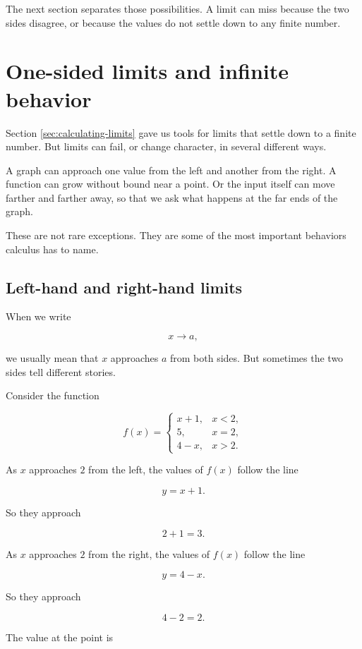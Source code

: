 The next section separates those possibilities.  A limit can miss because the two sides disagree, or because the values do not settle down to any finite number.
\section{One-sided limits and infinite behavior}
\label{sec:one-sided-infinite-limits}

Section \ref{sec:calculating-limits} gave us tools for limits that settle down to a finite number.  But limits can fail, or change character, in several different ways.

A graph can approach one value from the left and another from the right.  A function can grow without bound near a point.  Or the input itself can move farther and farther away, so that we ask what happens at the far ends of the graph.

These are not rare exceptions.  They are some of the most important behaviors calculus has to name.

\subsection{Left-hand and right-hand limits}
\label{subsec:left-right-limits}

When we write

\[
x\to a,
\]

we usually mean that \(x\) approaches \(a\) from both sides.  But sometimes the two sides tell different stories.

Consider the function

\[
f(x)=
\begin{cases}
x+1, & x<2,\\
5, & x=2,\\
4-x, & x>2.
\end{cases}
\]

As \(x\) approaches \(2\) from the left, the values of \(f(x)\) follow the line

\[
y=x+1.
\]

So they approach

\[
2+1=3.
\]

As \(x\) approaches \(2\) from the right, the values of \(f(x)\) follow the line

\[
y=4-x.
\]

So they approach

\[
4-2=2.
\]

The value at the point is

